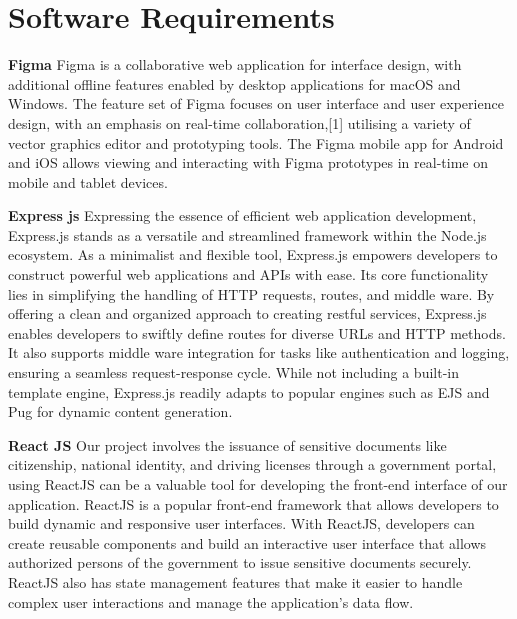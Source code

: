 \section{Software Requirements}

\textbf{Figma} \newline
Figma is a collaborative web application for interface design, with additional offline features enabled by desktop applications for macOS and Windows. The feature set of Figma focuses on user interface and user experience design, with an emphasis on real-time collaboration,[1] utilising a variety of vector graphics editor and prototyping tools. The Figma mobile app for Android and iOS allows viewing and interacting with Figma prototypes in real-time on mobile and tablet devices.

\textbf{Express js}\newline
Expressing the essence of efficient web application development, Express.js stands as a versatile and streamlined framework within the Node.js ecosystem. As a minimalist and flexible tool, Express.js empowers developers to construct powerful web applications and APIs with ease. Its core functionality lies in simplifying the handling of HTTP requests, routes, and middle ware. By offering a clean and organized approach to creating restful services, Express.js enables developers to swiftly define routes for diverse URLs and HTTP methods. It also supports middle ware integration for tasks like authentication and logging, ensuring a seamless request-response cycle. While not including a built-in template engine, Express.js readily adapts to popular engines such as EJS and Pug for dynamic content generation.

\textbf{React JS}\newline
   Our project involves the issuance of sensitive documents like citizenship, national identity, and driving licenses through a government portal, using ReactJS can be a valuable tool for developing the front-end interface of our application. ReactJS is a popular front-end framework that allows developers to build dynamic and responsive user interfaces. With ReactJS, developers can create reusable components and build an interactive user interface that allows authorized persons of the government to issue sensitive documents securely. ReactJS also has state management features that make it easier to handle complex user interactions and manage the application's data flow.
   
